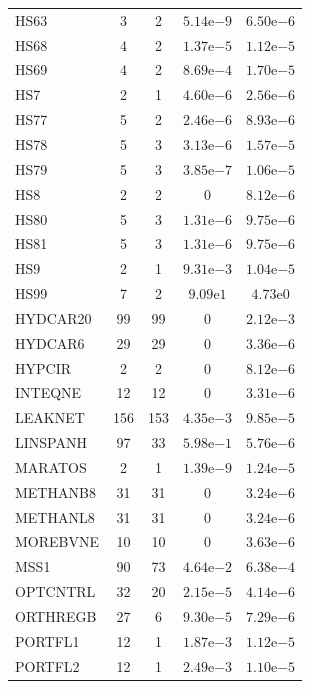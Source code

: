 \documentclass[11pt]{article}
\begin{document}
\begin{center}
\begin{longtable}{lcccc}
HS63 & 3 & 2 & $5.14\mathrm{e}{-9}$ & $6.50\mathrm{e}{-6}$\\
HS68 & 4 & 2 & $1.37\mathrm{e}{-5}$ & $1.12\mathrm{e}{-5}$\\
HS69 & 4 & 2 & $8.69\mathrm{e}{-4}$ & $1.70\mathrm{e}{-5}$\\
HS7 & 2 & 1 & $4.60\mathrm{e}{-6}$ & $2.56\mathrm{e}{-6}$\\
HS77 & 5 & 2 & $2.46\mathrm{e}{-6}$ & $8.93\mathrm{e}{-6}$\\
HS78 & 5 & 3 & $3.13\mathrm{e}{-6}$ & $1.57\mathrm{e}{-5}$\\
HS79 & 5 & 3 & $3.85\mathrm{e}{-7}$ & $1.06\mathrm{e}{-5}$\\
HS8 & 2 & 2 & $0$ & $8.12\mathrm{e}{-6}$\\
HS80 & 5 & 3 & $1.31\mathrm{e}{-6}$ & $9.75\mathrm{e}{-6}$\\
HS81 & 5 & 3 & $1.31\mathrm{e}{-6}$ & $9.75\mathrm{e}{-6}$\\
HS9 & 2 & 1 & $9.31\mathrm{e}{-3}$ & $1.04\mathrm{e}{-5}$\\
HS99 & 7 & 2 & $9.09\mathrm{e}{1}$ & $4.73\mathrm{e}{0}$\\
HYDCAR20 & 99 & 99 & $0$ & $2.12\mathrm{e}{-3}$\\
HYDCAR6 & 29 & 29 & $0$ & $3.36\mathrm{e}{-6}$\\
HYPCIR & 2 & 2 & $0$ & $8.12\mathrm{e}{-6}$\\
INTEQNE & 12 & 12 & $0$ & $3.31\mathrm{e}{-6}$\\
LEAKNET & 156 & 153 & $4.35\mathrm{e}{-3}$ & $9.85\mathrm{e}{-5}$\\
LINSPANH & 97 & 33 & $5.98\mathrm{e}{-1}$ & $5.76\mathrm{e}{-6}$\\
MARATOS & 2 & 1 & $1.39\mathrm{e}{-9}$ & $1.24\mathrm{e}{-5}$\\
METHANB8 & 31 & 31 & $0$ & $3.24\mathrm{e}{-6}$\\
METHANL8 & 31 & 31 & $0$ & $3.24\mathrm{e}{-6}$\\
MOREBVNE & 10 & 10 & $0$ & $3.63\mathrm{e}{-6}$\\
MSS1 & 90 & 73 & $4.64\mathrm{e}{-2}$ & $6.38\mathrm{e}{-4}$\\
OPTCNTRL & 32 & 20 & $2.15\mathrm{e}{-5}$ & $4.14\mathrm{e}{-6}$\\
ORTHREGB & 27 & 6 & $9.30\mathrm{e}{-5}$ & $7.29\mathrm{e}{-6}$\\
PORTFL1 & 12 & 1 & $1.87\mathrm{e}{-3}$ & $1.12\mathrm{e}{-5}$\\
PORTFL2 & 12 & 1 & $2.49\mathrm{e}{-3}$ & $1.10\mathrm{e}{-5}$\\

\end{longtable}
\end{center}
\end{document}
